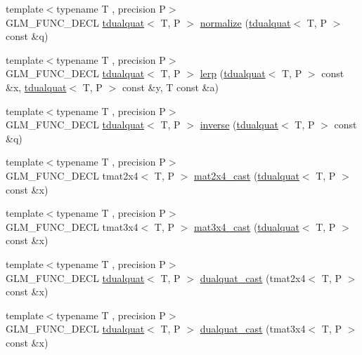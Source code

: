 \begin{DoxyCompactItemize}
{\footnotesize template$<$typename T , precision P$>$ }\\G\+L\+M\+\_\+\+F\+U\+N\+C\+\_\+\+D\+E\+C\+L \hyperlink{structglm_1_1tdualquat}{tdualquat}$<$ T, P $>$ \hyperlink{group__gtx__dual__quaternion_ga495818aa48c23e9e730f87a3c337d1d5}{normalize} (\hyperlink{structglm_1_1tdualquat}{tdualquat}$<$ T, P $>$ const \&q)
\item 
{\footnotesize template$<$typename T , precision P$>$ }\\G\+L\+M\+\_\+\+F\+U\+N\+C\+\_\+\+D\+E\+C\+L \hyperlink{structglm_1_1tdualquat}{tdualquat}$<$ T, P $>$ \hyperlink{group__gtx__dual__quaternion_ga8039b88397ca09275be924a26a806a59}{lerp} (\hyperlink{structglm_1_1tdualquat}{tdualquat}$<$ T, P $>$ const \&x, \hyperlink{structglm_1_1tdualquat}{tdualquat}$<$ T, P $>$ const \&y, T const \&a)
\item 
{\footnotesize template$<$typename T , precision P$>$ }\\G\+L\+M\+\_\+\+F\+U\+N\+C\+\_\+\+D\+E\+C\+L \hyperlink{structglm_1_1tdualquat}{tdualquat}$<$ T, P $>$ \hyperlink{group__gtx__dual__quaternion_ga2149d3cb8af04d9530de0cd16aa1aab2}{inverse} (\hyperlink{structglm_1_1tdualquat}{tdualquat}$<$ T, P $>$ const \&q)
\item 
{\footnotesize template$<$typename T , precision P$>$ }\\G\+L\+M\+\_\+\+F\+U\+N\+C\+\_\+\+D\+E\+C\+L tmat2x4$<$ T, P $>$ \hyperlink{group__gtx__dual__quaternion_ga2d124748183e12db8288eeaca350298e}{mat2x4\+\_\+cast} (\hyperlink{structglm_1_1tdualquat}{tdualquat}$<$ T, P $>$ const \&x)
\item 
{\footnotesize template$<$typename T , precision P$>$ }\\G\+L\+M\+\_\+\+F\+U\+N\+C\+\_\+\+D\+E\+C\+L tmat3x4$<$ T, P $>$ \hyperlink{group__gtx__dual__quaternion_ga576745d979e3c079a64152490c816954}{mat3x4\+\_\+cast} (\hyperlink{structglm_1_1tdualquat}{tdualquat}$<$ T, P $>$ const \&x)
\item 
{\footnotesize template$<$typename T , precision P$>$ }\\G\+L\+M\+\_\+\+F\+U\+N\+C\+\_\+\+D\+E\+C\+L \hyperlink{structglm_1_1tdualquat}{tdualquat}$<$ T, P $>$ \hyperlink{group__gtx__dual__quaternion_gada9799afe2b62394dc498534beb5bc78}{dualquat\+\_\+cast} (tmat2x4$<$ T, P $>$ const \&x)
\item 
{\footnotesize template$<$typename T , precision P$>$ }\\G\+L\+M\+\_\+\+F\+U\+N\+C\+\_\+\+D\+E\+C\+L \hyperlink{structglm_1_1tdualquat}{tdualquat}$<$ T, P $>$ \hyperlink{group__gtx__dual__quaternion_ga20eb5758beb73cc6dbc2d9104f03ec20}{dualquat\+\_\+cast} (tmat3x4$<$ T, P $>$ const \&x)

\end{DoxyCompactItemize}

